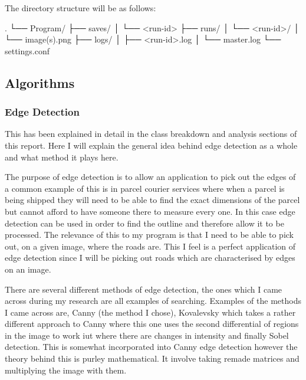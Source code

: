 \begin{FlushLeft}
    The directory structure will be as follows:
    \begin{pseudocode}
    .
    └── Program/
        ├── saves/
        │   └── <run-id>
        ├── runs/
        │   └── <run-id>/
        │       └── image(s).png
        ├── logs/
        │   ├── <run-id>.log
        │   └── master.log
        └── settings.conf
    \end{pseudocode}


    \bk

    \BK

    \subsection{Algorithms}

    \subsubsection{Edge Detection}
    This has been explained in detail in the class breakdown and analysis sections of this report. Here I will explain the general idea behind edge detection as a whole and what method it plays here. \\ \bk

    The purpose of edge detection is to allow an application to pick out the edges of a common example of this is in parcel courier services where when a parcel is being shipped they will need to be able to find the exact dimensions of the parcel but cannot afford to have someone there to measure every one. In this case edge detection can be used in order to find the outline and therefore allow it to be processed. The relevance of this to my program is that I need to be able to pick out, on a given image, where the roads are. This I feel is a perfect application of edge detection since I will be picking out roads which are characterised by edges on an image. \\ \bk

    There are several different methods of edge detection, the ones which I came across during my research are all examples of searching. Examples of the methods I came across are, Canny (the method I chose), Kovalevsky which takes a rather different approach to Canny where this one uses the second differential of regions in the image to work iut where there are changes in intensity and finally Sobel detection. This is somewhat incorporated into Canny edge detection however the theory behind this is purley mathematical. It involve taking remade matrices and multiplying the image with them. \\ \bk


\end{FlushLeft}

